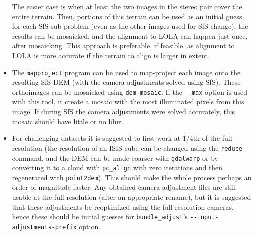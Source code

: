 \begin{itemize}{}
  The easier case is when at least the two images in the stereo pair
  cover the entire terrain. Then, portions of this terrain can be used
  as an initial guess for each SfS sub-problem (even as the other images
  used for SfS change), the results can be mosaicked, and the alignment
  to LOLA can happen just once, after mosaicking. This approach is
  preferable, if feasible, as alignment to LOLA is more accurate if the
  terrain to align is larger in extent.

\item The \texttt{mapproject} program can be used to map-project each image
  onto the resulting SfS DEM (with the camera adjustments solved using
  SfS). These orthoimages can be mosaicked using \texttt{dem\_mosaic}. If the
  \texttt{-\/-max} option is used with this tool, it create a mosaic with
  the most illuminated pixels from this image. If during SfS the camera
  adjustments were solved accurately, this mosaic should have little or no
  blur.

\item For challenging datasets it is suggested to first work at 1/4th of
the full resolution (the resolution of an ISIS cube can be changed using
the \texttt{reduce} command, and the DEM can be made coarser with
\texttt{gdalwarp} or by converting it to a cloud with \texttt{pc\_align}
with zero iterations and then regenerated with \texttt{point2dem}).
This should make the whole process perhaps an order of magnitude
faster. Any obtained camera adjustment files are still usable at the
full resolution (after an appropriate rename), but it is suggested that
these adjustments be reoptimized using the full resolution cameras,
hence these should be initial guesses for \texttt{bundle\_adjust}'s 
\texttt{-\/-input-adjustments-prefix} option.

\end{itemize}
